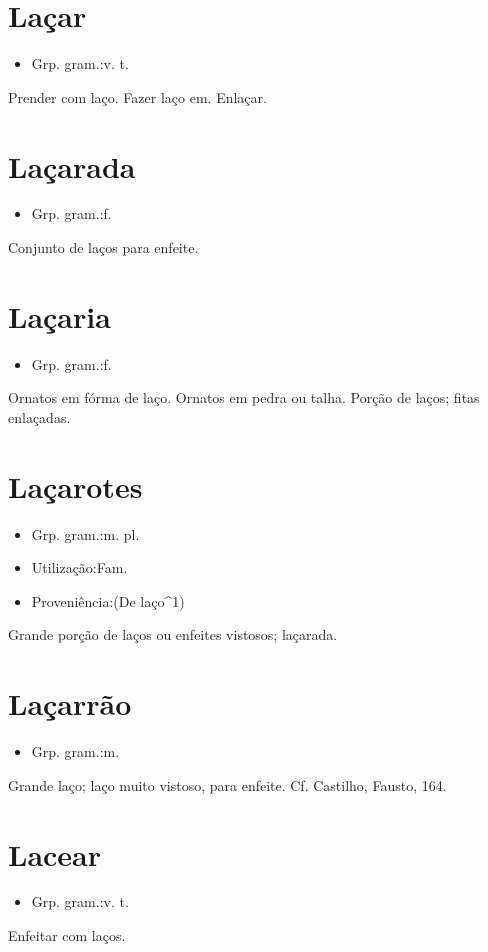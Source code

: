 \section{Laçar}
\begin{itemize}
\item {Grp. gram.:v. t.}
\end{itemize}
Prender com laço.
Fazer laço em.
Enlaçar.
\section{Laçarada}
\begin{itemize}
\item {Grp. gram.:f.}
\end{itemize}
Conjunto de laços para enfeite.
\section{Laçaria}
\begin{itemize}
\item {Grp. gram.:f.}
\end{itemize}
Ornatos em fórma de laço.
Ornatos em pedra ou talha.
Porção de laços; fitas enlaçadas.
\section{Laçarotes}
\begin{itemize}
\item {Grp. gram.:m. pl.}
\end{itemize}
\begin{itemize}
\item {Utilização:Fam.}
\end{itemize}
\begin{itemize}
\item {Proveniência:(De \textunderscore laço\textunderscore ^1)}
\end{itemize}
Grande porção de laços ou enfeites vistosos; laçarada.
\section{Laçarrão}
\begin{itemize}
\item {Grp. gram.:m.}
\end{itemize}
Grande laço; laço muito vistoso, para enfeite. Cf. Castilho, \textunderscore Fausto\textunderscore , 164.
\section{Lacear}
\begin{itemize}
\item {Grp. gram.:v. t.}
\end{itemize}
Enfeitar com laços.
